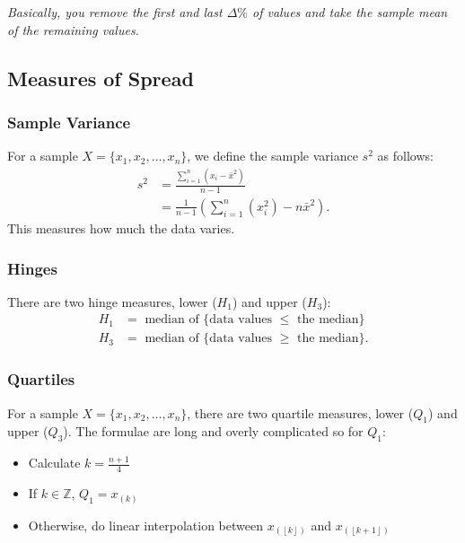 \documentclass[a4paper, 12pt, twoside]{article}
\def\lf{\left\lfloor}
\def\rf{\right\rfloor}
\begin{document}
\textit{Basically, you remove the first and last $\Delta\%$
    of values and take the sample mean of the remaining values.}

\subsection{Measures of Spread}

\subsubsection{Sample Variance}

For a sample $X = \{x_1, x_2, \ldots, x_n\}$, we define the sample
variance $s^2$ as follows:
\begin{align*}
    s^2 & = \frac{\sum_{i = 1}^n (x_i - \bar{x}^2)}{n - 1}                  \\
        & = \frac{1}{n-1}\left(\sum_{i = 1}^{n}(x_i^2) - n\bar{x}^2\right).
\end{align*}
This measures how much the data varies.

\subsubsection{Hinges}

There are two hinge measures, lower ($H_1$) and upper ($H_3$):
\begin{align*}
    H_1 & = \text{ median of \{data values } \leq \text{ the median\}}  \\
    H_3 & = \text{ median of \{data values } \geq \text{ the median\}}.
\end{align*}

\subsubsection{Quartiles}

For a sample $X = \{x_1, x_2, \ldots, x_n\}$, there are two quartile
measures, lower ($Q_1$) and upper ($Q_3$). The formulae are long and
overly complicated so for $Q_1$:

\begin{itemize}
    \item Calculate $k = \frac{n + 1}{4}$
    \item If $k \in \mathbb{Z}$, $Q_1 = x_{(k)}$
    \item Otherwise, do linear interpolation between $x_{(\lf k\rf)}$
          and $x_{(\lf k+1\rf)}$
\end{itemize}
\end{document}
